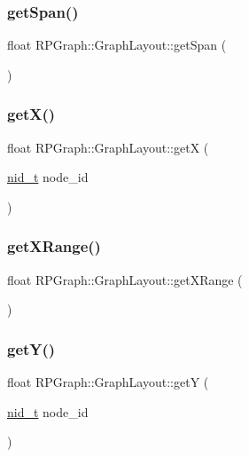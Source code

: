 \subsubsection{\texorpdfstring{get\+Span()}{getSpan()}}
{\footnotesize\ttfamily float R\+P\+Graph\+::\+Graph\+Layout\+::get\+Span (\begin{DoxyParamCaption}{ }\end{DoxyParamCaption})}

\mbox{\label{classRPGraph_1_1GraphLayout_a447d80a00c47ad2fb446e3653face38c}} 
\subsubsection{\texorpdfstring{get\+X()}{getX()}}
{\footnotesize\ttfamily float R\+P\+Graph\+::\+Graph\+Layout\+::getX (\begin{DoxyParamCaption}\item[{\mbox{\hyperlink{namespaceRPGraph_ab3ae34f1ab88e48f43794c30c8697b74}{nid\+\_\+t}}}]{node\+\_\+id }\end{DoxyParamCaption})}

\mbox{\label{classRPGraph_1_1GraphLayout_a18a15867788b88db16f0938540107748}} 
\subsubsection{\texorpdfstring{get\+X\+Range()}{getXRange()}}
{\footnotesize\ttfamily float R\+P\+Graph\+::\+Graph\+Layout\+::get\+X\+Range (\begin{DoxyParamCaption}{ }\end{DoxyParamCaption})}

\mbox{\label{classRPGraph_1_1GraphLayout_a75826cfc0cc24fd4902758bc1ad42c4b}} 
\subsubsection{\texorpdfstring{get\+Y()}{getY()}}
{\footnotesize\ttfamily float R\+P\+Graph\+::\+Graph\+Layout\+::getY (\begin{DoxyParamCaption}\item[{\mbox{\hyperlink{namespaceRPGraph_ab3ae34f1ab88e48f43794c30c8697b74}{nid\+\_\+t}}}]{node\+\_\+id }\end{DoxyParamCaption})}

